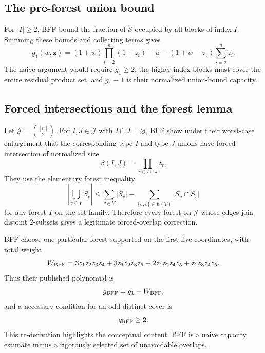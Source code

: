 \documentclass[11pt]{article}
\theoremstyle{definition}
\begin{document}
\subsection{The pre-forest union bound}

For $|I|\ge2$, BFF bound the fraction of $\mathcal S$ occupied by all blocks of index $I$.
Summing these bounds and collecting terms gives
\begin{equation}\label{eq:g1}
 g_1(w,\mathbf z)
 =(1+w)\prod_{i=2}^{n}(1+z_i)-w
 -(1+w-z_1)\sum_{i=2}^{n}z_i.
\end{equation}
The naive argument would require $g_1\ge2$: the higher-index blocks must cover the entire
residual product set, and $g_1-1$ is their normalized union-bound capacity.

\subsection{Forced intersections and the forest lemma}

Let $\mathcal J=\binom{[n]}2$.  For $I,J\in\mathcal J$ with $I\cap J=\varnothing$, BFF show
under their worst-case enlargement that the corresponding type-$I$ and type-$J$ unions have
forced intersection of normalized size
\begin{equation}\label{eq:beta}
 \beta(I,J)=\prod_{r\in I\cup J}z_r.
\end{equation}
They use the elementary forest inequality
\[
 \left|\bigcup_{v\in V}S_v\right|
 \le \sum_{v\in V}|S_v|-
 \sum_{\{u,v\}\in E(T)}|S_u\cap S_v|
\]
for any forest $T$ on the set family.  Therefore every forest on $\mathcal J$ whose edges join
disjoint 2-subsets gives a legitimate forced-overlap correction.

BFF choose one particular forest supported on the first five coordinates, with total weight
\begin{equation}\label{eq:wbff}
 W_{\rm BFF}
 =3z_1z_2z_3z_4+3z_1z_2z_3z_5
  +2z_1z_2z_4z_5+z_1z_3z_4z_5.
\end{equation}
Thus their published polynomial is
\begin{equation}\label{eq:gbff}
 g_{\rm BFF}=g_1-W_{\rm BFF},
\end{equation}
and a necessary condition for an odd distinct cover is
\begin{equation}\label{eq:bffcondition}
 g_{\rm BFF}\ge2.
\end{equation}
This re-derivation highlights the conceptual content: BFF is a naive capacity estimate minus a
rigorously selected set of unavoidable overlaps.
\end{document}
